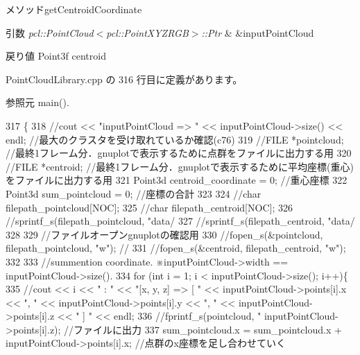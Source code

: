 メソッドget\-Centroid\-Coordinate 


\begin{DoxyParams}{引数}
{\em pcl\-::\-Point\-Cloud$<$pcl\-::\-Point\-X\-Y\-Z\-R\-G\-B$>$\-::\-Ptr} & \&input\-Point\-Cloud \\
\hline
\end{DoxyParams}
\begin{DoxyReturn}{戻り値}
Point3f centroid 
\end{DoxyReturn}


 Point\-Cloud\-Library.\-cpp の 316 行目に定義があります。



参照元 main().


\begin{DoxyCode}
317 \{
318     \textcolor{comment}{//cout << "inputPointCloud => " << inputPointCloud->size() << endl; //最大のクラスタを受け取れているか確認(c76)}
319     \textcolor{comment}{//FILE *pointcloud; //最終1フレーム分．gnuplotで表示するために点群をファイルに出力する用}
320     \textcolor{comment}{//FILE *centroid; //最終1フレーム分．gnuplotで表示するために平均座標(重心)をファイルに出力する用}
321     Point3d centroid\_coordinate = 0; \textcolor{comment}{//重心座標}
322     Point3d sum\_pointcloud = 0; \textcolor{comment}{//座標の合計}
323 
324     \textcolor{comment}{//char filepath\_pointcloud[NOC];}
325     \textcolor{comment}{//char filepath\_centroid[NOC];}
326     \textcolor{comment}{//sprintf\_s(filepath\_pointcloud, "data/%
327     \textcolor{comment}{//sprintf\_s(filepath\_centroid, "data/%
328 
329     \textcolor{comment}{//ファイルオープンgnuplotの確認用}
330     \textcolor{comment}{//fopen\_s(&pointcloud, filepath\_pointcloud, "w"); //}
331     \textcolor{comment}{//fopen\_s(&centroid, filepath\_centroid, "w");}
332 
333     \textcolor{comment}{//summention coordinate. ※inputPointCloud->width == inputPointCloud->size().}
334     \textcolor{keywordflow}{for} (\textcolor{keywordtype}{int} i = 1; i < inputPointCloud->size(); i++)\{
335         \textcolor{comment}{//cout << i << " : " << "[x, y, z] => [ " << inputPointCloud->points[i].x << ", " <<
       inputPointCloud->points[i].y << ", " << inputPointCloud->points[i].z << " ] " << endl;}
336         \textcolor{comment}{//fprintf\_s(pointcloud, "%
       inputPointCloud->points[i].z); //ファイルに出力}
337         sum\_pointcloud.x = sum\_pointcloud.x + inputPointCloud->points[i].x; \textcolor{comment}{//点群のx座標を足し合わせていく}
}}
\end{DoxyCode}
